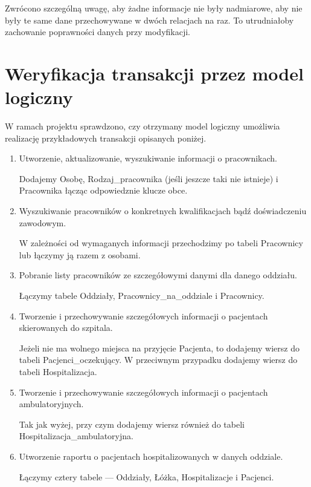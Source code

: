 Zwrócono szczególną uwagę, aby żadne informacje nie były nadmiarowe, aby nie były te same dane przechowywane w dwóch relacjach na raz. To utrudniałoby zachowanie poprawności danych przy modyfikacji.

\section{Weryfikacja transakcji przez model logiczny}
W ramach projektu sprawdzono, czy otrzymany model logiczny umożliwia realizację przykładowych transakcji opisanych poniżej.

\begin{enumerate}


\item Utworzenie, aktualizowanie, wyszukiwanie informacji o pracownikach.

Dodajemy Osobę, Rodzaj\_pracownika (jeśli jeszcze taki nie istnieje) i Pracownika łącząc odpowiedznie klucze obce.

\item Wyszukiwanie pracowników o konkretnych kwalifikacjach bądź doświadczeniu zawodowym.

W zależności od wymaganych informacji przechodzimy po tabeli Pracownicy lub łączymy ją razem z osobami.

\item Pobranie listy pracowników ze szczegółowymi danymi dla danego oddziału.

Łączymy tabele Oddziały, Pracownicy\_na\_oddziale i Pracownicy.

\item Tworzenie i przechowywanie szczegółowych informacji o pacjentach  skierowanych do szpitala.

Jeżeli nie ma wolnego miejsca na przyjęcie Pacjenta, to dodajemy wiersz do tabeli Pacjenci\_oczekujący. W przeciwnym przypadku dodajemy wiersz do tabeli Hospitalizacja.

\item Tworzenie i przechowywanie szczegółowych informacji o pacjentach ambulatoryjnych.

Tak jak wyżej, przy czym dodajemy wiersz również do tabeli Hospitalizacja\_ambulatoryjna.

\item Utworzenie raportu o pacjentach hospitalizowanych w danych oddziale.

Łączymy cztery tabele --- Oddziały, Łóżka, Hospitalizacje i Pacjenci.


\end{enumerate}
